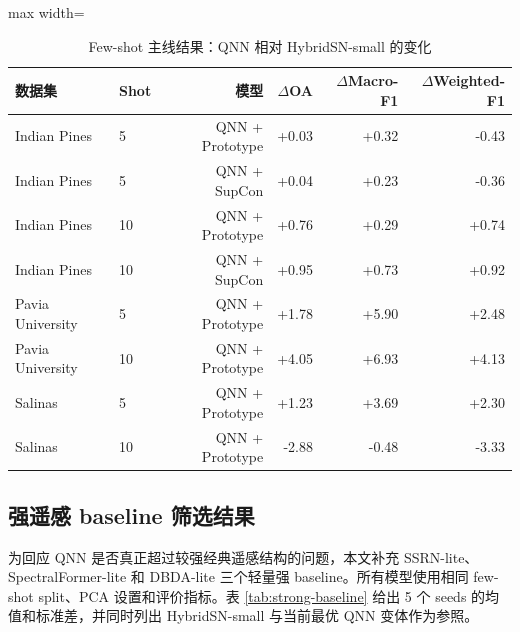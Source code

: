 \documentclass[UTF8,a4paper,zihao=-4,fontset=fandol]{ctexart}
\begin{document}
\begin{table}[htbp]
\centering
\caption{Few-shot 主线结果：QNN 相对 HybridSN-small 的变化}
\label{tab:fewshot-main}
\begin{adjustbox}{max width=\textwidth}
\begin{tabular}{llrrrr}
\toprule
数据集 & Shot & 模型 & $\Delta$OA & $\Delta$Macro-F1 & $\Delta$Weighted-F1 \\
\midrule
Indian Pines & 5 & QNN + Prototype & +0.03 & +0.32 & -0.43 \\
Indian Pines & 5 & QNN + SupCon & +0.04 & +0.23 & -0.36 \\
Indian Pines & 10 & QNN + Prototype & +0.76 & +0.29 & +0.74 \\
Indian Pines & 10 & QNN + SupCon & +0.95 & +0.73 & +0.92 \\
Pavia University & 5 & QNN + Prototype & +1.78 & +5.90 & +2.48 \\
Pavia University & 10 & QNN + Prototype & +4.05 & +6.93 & +4.13 \\
Salinas & 5 & QNN + Prototype & +1.23 & +3.69 & +2.30 \\
Salinas & 10 & QNN + Prototype & -2.88 & -0.48 & -3.33 \\
\bottomrule
\end{tabular}
\end{adjustbox}
\end{table}

\subsection{强遥感 baseline 筛选结果}

为回应 QNN 是否真正超过较强经典遥感结构的问题，本文补充 SSRN-lite、SpectralFormer-lite 和 DBDA-lite 三个轻量强 baseline。所有模型使用相同 few-shot split、PCA 设置和评价指标。表 \ref{tab:strong-baseline} 给出 5 个 seeds 的均值和标准差，并同时列出 HybridSN-small 与当前最优 QNN 变体作为参照。
\end{document}
